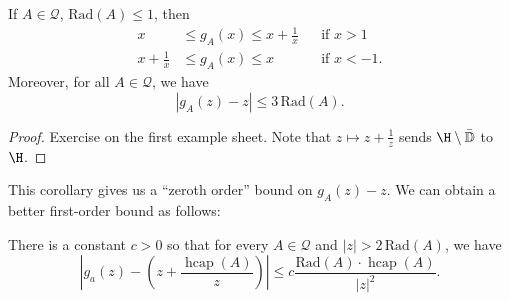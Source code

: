 \documentclass[a4paper]{article}
\renewcommand\D{\mathbb{D}}
\DeclareMathOperator\hcap{hcap}
\newcommand\rad{\mathrm{Rad}}
\begin{document}
\begin{cor}
  If $A \in \mathcal{Q}$, $\rad(A) \leq 1$, then
  \begin{align*}
    x &\leq g_A(x) \leq x + \frac{1}{x}&&\text{if }x > 1\\
    x + \frac{1}{x} &\leq g_A(x) \leq x && \text{if }x < -1.
  \end{align*}
  Moreover, for all $A \in \mathcal{Q}$, we have
  \[
    |g_A(z) - z| \leq 3\, \rad(A).
  \]
\end{cor}

\begin{proof}
  Exercise on the first example sheet. Note that $z \mapsto z + \frac{1}{z}$ sends $\H \setminus \bar{\D}$ to $\H$.
\end{proof}
This corollary gives us a ``zeroth order'' bound on $g_A(z) - z$. We can obtain a better first-order bound as follows:
\begin{prop}
  There is a constant $c > 0$ so that for every $A \in \mathcal{Q}$ and $|z| > 2\, \rad(A)$, we have
  \[
    \left|g_a(z) - \left(z + \frac{\hcap(A)}{z}\right)\right| \leq c \frac{\rad(A) \cdot \hcap(A)}{|z|^2}.
  \]
\end{prop}
\end{document}
